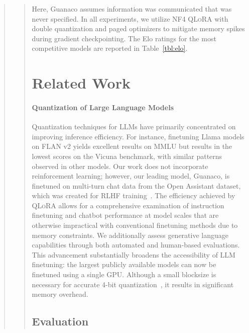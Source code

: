 {\begin{quote}
\begin{quote}
{Here, {Guanaco} assumes information was communicated that was never specified. In all experiments, we utilize NF4 \textsc{QLoRA} with double quantization and paged optimizers to mitigate memory spikes during gradient checkpointing. The Elo ratings for the most competitive models are reported in Table~\ref{tbl:elo}. \section{Related Work}

\paragraph{Quantization of Large Language Models} Quantization techniques for LLMs have primarily concentrated on improving inference efficiency. For instance, finetuning Llama models on FLAN v2 yields excellent results on MMLU but results in the lowest scores on the Vicuna benchmark, with similar patterns observed in other models. Our work does not incorporate reinforcement learning; however, our leading model, Guanaco, is finetuned on multi-turn chat data from the Open Assistant dataset, which was created for RLHF training~\citep{kopf2023openassistant}. The efficiency achieved by \textsc{QLoRA} allows for a comprehensive examination of instruction finetuning and chatbot performance at model scales that are otherwise impractical with conventional finetuning methods due to memory constraints. We additionally assess generative language capabilities through both automated and human-based evaluations. This advancement substantially broadens the accessibility of LLM finetuning: the largest publicly available models can now be finetuned using a single GPU. Although a small blocksize is necessary for accurate 4-bit quantization~\citep{dettmers2022case}, it results in significant memory overhead. \subsection{Evaluation}

}
\end{quote}
\end{quote}}
